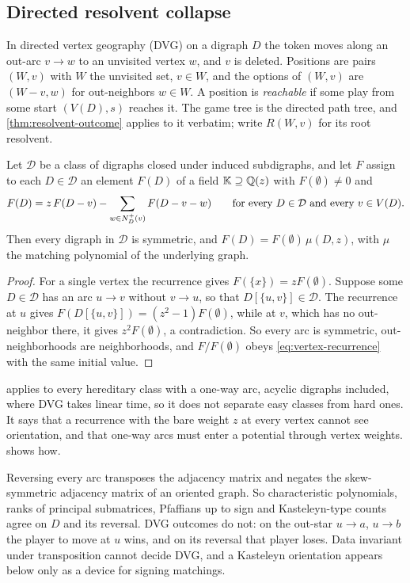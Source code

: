 \subsection{Directed resolvent collapse}\label{ssec:directed}
In directed vertex geography (DVG) on a digraph $D$ the token moves along an out-arc $v\to w$ to an unvisited vertex $w$, and $v$ is deleted. Positions are pairs $(W,v)$ with $W$ the unvisited set, $v\in W$, and the options of $(W,v)$ are $(W-v,w)$ for out-neighbors $w\in W$. A position is \emph{reachable} if some play from some start $(V(D),s)$ reaches it. The game tree is the directed path tree, and \cref{thm:resolvent-outcome} applies to it verbatim; write $R(W,v)$ for its root resolvent.

\begin{theorem}\label{thm:unweighted}
Let $\mathcal D$ be a class of digraphs closed under induced subdigraphs, and let $F$ assign to each $D\in\mathcal D$ an element $F(D)$ of a field $\mathbb K\supseteq\Qz$ with $F(\emptyset)\ne0$ and
\[
F(D)=z\,F(D-v)-\sum_{w\in\nplus_D(v)}F(D-v-w)\qquad\text{for every }D\in\mathcal D\text{ and every }v\in V(D).
\]
Then every digraph in $\mathcal D$ is symmetric, and $F(D)=F(\emptyset)\,\mu(D,z)$, with $\mu$ the matching polynomial of the underlying graph.
\end{theorem}
\begin{proof}
For a single vertex the recurrence gives $F(\{x\})=zF(\emptyset)$. Suppose some $D\in\mathcal D$ has an arc $u\to v$ without $v\to u$, so that $D[\{u,v\}]\in\mathcal D$. The recurrence at $u$ gives $F(D[\{u,v\}])=(z^2-1)F(\emptyset)$, while at $v$, which has no out-neighbor there, it gives $z^2F(\emptyset)$, a contradiction. So every arc is symmetric, out-neighborhoods are neighborhoods, and $F/F(\emptyset)$ obeys \eqref{eq:vertex-recurrence} with the same initial value.
\end{proof}

 applies to every hereditary class with a one-way arc, acyclic digraphs included, where DVG takes linear time, so it does not separate easy classes from hard ones. It says that a recurrence with the bare weight $z$ at every vertex cannot see orientation, and that one-way arcs must enter a potential through vertex weights.  shows how.

\begin{remark}\label{rem:transposition}
Reversing every arc transposes the adjacency matrix and negates the skew-symmetric adjacency matrix of an oriented graph. So characteristic polynomials, ranks of principal submatrices, Pfaffians up to sign and Kasteleyn-type counts agree on $D$ and its reversal. DVG outcomes do not: on the out-star $u\to a$, $u\to b$ the player to move at $u$ wins, and on its reversal that player loses. Data invariant under transposition cannot decide DVG, and a Kasteleyn orientation appears below only as a device for signing matchings.
\end{remark}

